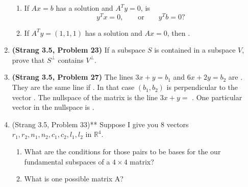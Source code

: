 \documentclass[11pt]{article}
\newcommand{\rr}{\mathbb{R}}
\begin{document}
\begin{enumerate}
\begin{enumerate}
\item If $Ax = b$ has a solution and $A^Ty = 0$, is
\[ y^Tx = 0, \qquad \text{or} \qquad y^Tb = 0? \]

\item If $A^Ty = (1,1,1)$ has a solution and $Ax = 0$, then \underline{\phantom{aaaaaaaaaaaaaa}}.

\end{enumerate}

\item  \textbf{(Strang 3.5, Problem 23)} If a subspace $S$ is contained in a subspace $V$, prove that $S^\perp$ contains $V^\perp$.

\item \textbf{(Strang 3.5, Problem 27)} The lines $3x + y = b_1$ and $6x + 2y = b_2$ are \underline{\phantom{aaaaaaaaaaaaaa}}.  They are the same line if \underline{\phantom{aaaaaaaaaaaaaa}}. In that case $(b_1, b_2)$ is perpendicular to the vector \underline{\phantom{aaaaaaaaaaaaaa}}.  The nullspace of the matrix is the line $3x + y =$ \underline{\phantom{aaaaaaaa}}.  One particular vector in the nullspace is \underline{\phantom{aaaaaaaaaaaaaa}}.

\item (Strang 3.5, Problem 33)** Suppose I give you $8$ vectors $r_1, r_2, n_1, n_2, c_1, c_2, l_1, l_2$ in $\rr^4$.

\begin{enumerate}

\item What are the conditions for those pairs to be bases for the our fundamental subspaces of a $4 \times 4$ matrix?

\item What is one possible matrix A?

\end{enumerate}




\end{enumerate}
\end{document}
